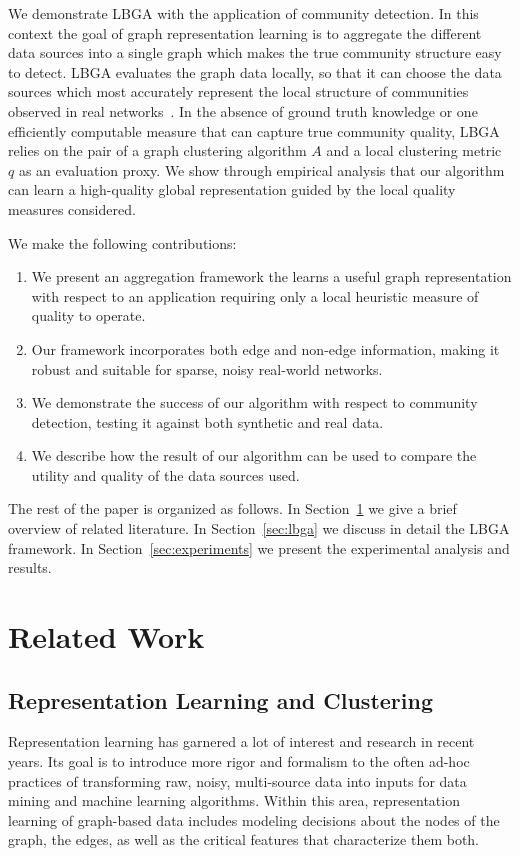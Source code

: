 \documentclass[twoside,twocolumn]{article}
\begin{document}
We demonstrate LBGA with the application of community detection. In this
context the goal of graph representation learning is to aggregate the different
data sources into a single graph which makes the true community structure easy
to detect.  LBGA evaluates the graph data locally, so that it can choose the
data sources which most accurately represent the local structure of communities
observed in real networks~\cite{Aggarwal2011,Leskovec2008}. In the absence of
ground truth knowledge or one efficiently computable measure that can capture
true community quality, LBGA relies on the pair of a graph clustering algorithm
$A$ and a local clustering metric $q$ as an evaluation proxy. 
We show through empirical analysis that our algorithm can learn a
high-quality global representation guided by the local quality measures
considered. 

We make the following contributions:

\begin{enumerate} 
   \item We present an aggregation framework the learns a useful graph
representation with respect to an application requiring only a local heuristic
measure of quality to operate.
   \item Our framework incorporates both edge and non-edge information, making
it robust and suitable for sparse, noisy real-world networks.
   \item We demonstrate the success of our algorithm with respect to community
detection, testing it against both synthetic and real data. 
   \item We describe how the result of our algorithm can be used to compare
the utility and quality of the data sources used.
\end{enumerate} 

The rest of the paper is organized as follows. In Section~\ref{sec:related} we
give a brief overview of related literature. In Section~\ref{sec:lbga} we
discuss in detail the LBGA framework. In Section~\ref{sec:experiments} we
present the experimental analysis and results.

\section{Related Work} 
\label{sec:related}
\subsection{Representation Learning and Clustering}
Representation learning has garnered a lot of interest and research in recent
years. Its goal is to introduce more rigor and formalism to the often ad-hoc
practices of transforming raw, noisy, multi-source data into inputs for data
mining and machine learning algorithms. Within this area, representation
learning of graph-based data includes modeling decisions about the nodes of the
graph, the edges, as well as the critical features that characterize them both.
\end{document}
